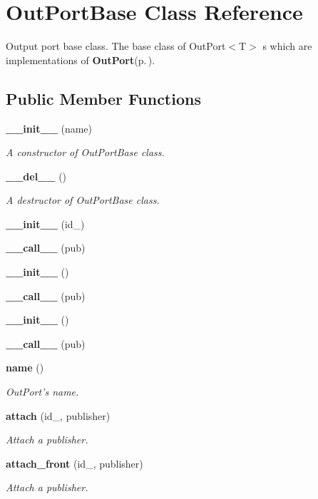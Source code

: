 \section{Out\-Port\-Base Class Reference}
\label{classOutPortBase}
Output port base class. The base class of Out\-Port$<$T$>$ s which are implementations of {\bf Out\-Port}{\rm (p.\,\pageref{classOutPort})}.  


\subsection*{Public Member Functions}
\begin{CompactItemize}
\item 
{\bf \_\-\_\-init\_\-\_\-} (name)
\begin{CompactList}\small\item\em A constructor of Out\-Port\-Base class. \item\end{CompactList}\item 
{\bf \_\-\_\-del\_\-\_\-} ()
\begin{CompactList}\small\item\em A destructor of Out\-Port\-Base class. \item\end{CompactList}\item 
{\bf \_\-\_\-init\_\-\_\-} (id\_\-)
\item 
{\bf \_\-\_\-call\_\-\_\-} (pub)
\item 
{\bf \_\-\_\-init\_\-\_\-} ()
\item 
{\bf \_\-\_\-call\_\-\_\-} (pub)
\item 
{\bf \_\-\_\-init\_\-\_\-} ()
\item 
{\bf \_\-\_\-call\_\-\_\-} (pub)
\item 
{\bf name} ()
\begin{CompactList}\small\item\em Out\-Port's name. \item\end{CompactList}\item 
{\bf attach} (id\_\-, publisher)
\begin{CompactList}\small\item\em Attach a publisher. \item\end{CompactList}\item 
{\bf attach\_\-front} (id\_\-, publisher)
\begin{CompactList}\small\item\em Attach a publisher. \item\end{CompactList}\item 

\end{CompactItemize}

